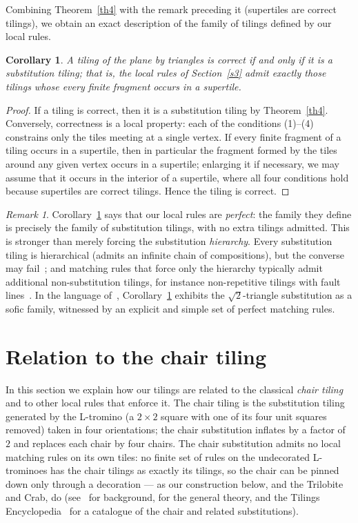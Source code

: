 \documentclass[11pt]{article}
\newtheorem{corollary}[theorem]{Corollary}
\theoremstyle{remark}
\newtheorem{remark}{Remark}
\begin{document}
Combining Theorem~\ref{th4} with the remark preceding it (supertiles are
correct tilings), we obtain an exact description of the family of tilings
defined by our local rules.

\begin{corollary}\label{cor-perfect}
A tiling of the plane by triangles is correct if and only if it is a
substitution tiling; that is, the local rules of Section~\ref{s3} admit exactly
those tilings whose every finite fragment occurs in a supertile.
\end{corollary}
\begin{proof}
If a tiling is correct, then it is a substitution tiling by Theorem~\ref{th4}.
Conversely, correctness is a local property: each of the conditions (1)--(4)
constrains only the tiles meeting at a single vertex. If every finite fragment
of a tiling occurs in a supertile, then in particular the fragment formed by
the tiles around any given vertex occurs in a supertile; enlarging it if
necessary, we may assume that it occurs in the interior of a supertile, where
all four conditions hold because supertiles are correct tilings. Hence the
tiling is correct.
\end{proof}

\begin{remark}\label{rem-perfect}
Corollary~\ref{cor-perfect} says that our local rules are \emph{perfect}: the
family they define is precisely the family of substitution tilings, with no
extra tilings admitted. This is stronger than merely forcing the substitution
\emph{hierarchy}. Every substitution tiling is hierarchical (admits an infinite
chain of compositions), but the converse may fail~\cite{gsrev,gs26}; and matching
rules that force only the hierarchy typically admit additional non-substitution
tilings, for instance non-repetitive tilings with fault lines~\cite{frank}. In
the language of~\cite{gsrev}, Corollary~\ref{cor-perfect} exhibits the
$\sqrt2$-triangle substitution as a sofic family, witnessed by an explicit and
simple set of perfect matching rules.
\end{remark}

\section{Relation to the chair tiling}\label{s4}

In this section we explain how our tilings are related to the classical
\emph{chair tiling} and to other local rules that enforce it. The chair tiling
is the substitution tiling generated by the L-tromino (a $2\times2$ square with
one of its four unit squares removed) taken in four orientations; the chair
substitution inflates by a factor of~$2$ and replaces each chair by four chairs.
The chair substitution admits no local matching rules on its own tiles: no
finite set of rules on the undecorated L-trominoes has the chair tilings as
exactly its tilings, so the chair can be pinned down only through a decoration
--- as our construction below, and the Trilobite and Crab, do (see~\cite{gschair}
for background, \cite{bg} for the general theory, and the Tilings
Encyclopedia~\cite{te} for a catalogue of the chair and related substitutions).
\end{document}
